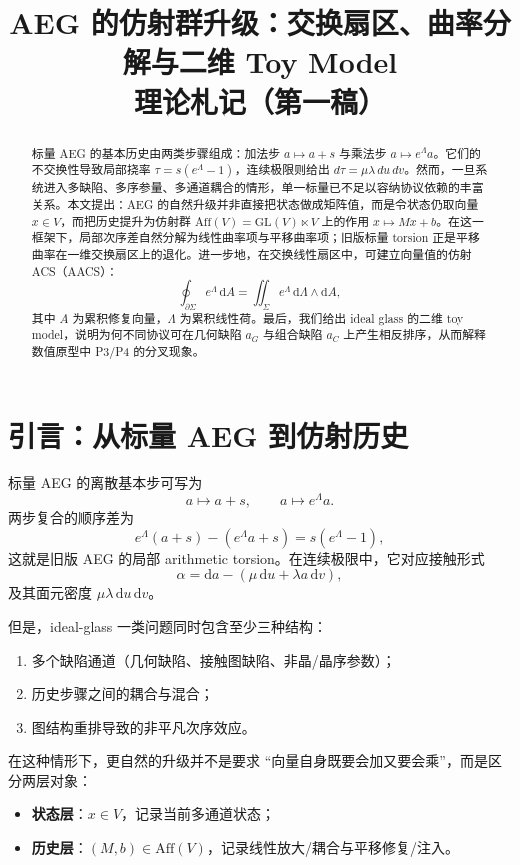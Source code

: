 \documentclass[11pt,a4paper]{ctexart}
\title{AEG 的仿射群升级：交换扇区、曲率分解与二维 Toy Model\\\large 理论札记（第一稿）}
\author{}
\date{}
\theoremstyle{remark}
\newcommand{\Aff}{\mathrm{Aff}}
\newcommand{\GL}{\mathrm{GL}}
\newcommand{\dd}{\mathrm{d}}
\begin{document}
\maketitle

\begin{abstract}
标量 AEG 的基本历史由两类步骤组成：加法步 $a\mapsto a+s$ 与乘法步 $a\mapsto e^{\Lambda}a$。它们的不交换性导致局部挠率 $\tau=s(e^{\Lambda}-1)$，连续极限则给出 $d\tau=\mu\lambda\,du\,dv$。然而，一旦系统进入多缺陷、多序参量、多通道耦合的情形，单一标量已不足以容纳协议依赖的丰富关系。本文提出：AEG 的自然升级并非直接把状态做成矩阵值，而是令状态仍取向量 $x\in V$，而把历史提升为仿射群 $\Aff(V)=\GL(V)\ltimes V$ 上的作用 $x\mapsto Mx+b$。在这一框架下，局部次序差自然分解为线性曲率项与平移曲率项；旧版标量 torsion 正是平移曲率在一维交换扇区上的退化。进一步地，在交换线性扇区中，可建立向量值的仿射 ACS（AACS）：
\[
\oint_{\partial\Sigma} e^{\Lambda}\,\dd A
=
\iint_{\Sigma} e^{\Lambda}\,\dd\Lambda\wedge\dd A,
\]
其中 $A$ 为累积修复向量，$\Lambda$ 为累积线性荷。最后，我们给出 ideal glass 的二维 toy model，说明为何不同协议可在几何缺陷 $a_G$ 与组合缺陷 $a_C$ 上产生相反排序，从而解释数值原型中 P3/P4 的分叉现象。
\end{abstract}

\section{引言：从标量 AEG 到仿射历史}

标量 AEG 的离散基本步可写为
\[
a\mapsto a+s,
\qquad
 a\mapsto e^{\Lambda}a.
\]
两步复合的顺序差为
\[
e^{\Lambda}(a+s)-(e^{\Lambda}a+s)=s(e^{\Lambda}-1),
\]
这就是旧版 AEG 的局部 arithmetic torsion。在连续极限中，它对应接触形式
\[
\alpha=\dd a-(\mu\,\dd u+\lambda a\,\dd v),
\]
及其面元密度 $\mu\lambda\,\dd u\,\dd v$。

但是，ideal-glass 一类问题同时包含至少三种结构：
\begin{enumerate}[label=(\roman*)]
    \item 多个缺陷通道（几何缺陷、接触图缺陷、非晶/晶序参数）；
    \item 历史步骤之间的耦合与混合；
    \item 图结构重排导致的非平凡次序效应。
\end{enumerate}
在这种情形下，更自然的升级并不是要求 ``向量自身既要会加又要会乘''，而是区分两层对象：
\begin{itemize}
    \item \textbf{状态层}：$x\in V$，记录当前多通道状态；
    \item \textbf{历史层}：$(M,b)\in\Aff(V)$，记录线性放大/耦合与平移修复/注入。
\end{itemize}
\end{document}
